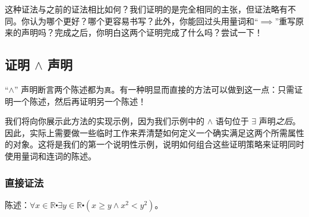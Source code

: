 这种证法与之前的证法相比如何？我们证明的是完全相同的主张，但证法略有不同。你认为哪个更好？哪个更容易书写？此外，你能回过头用量词和``$\implies$''重写原来的声明吗？完成之后，你明白这两个证明完成了什么吗？尝试一下！

\subsection{证明 $\land$ 声明}\label{sec:section4.9.4}

``$\land$'' 声明断言两个陈述都为\verb|真|。有一种明显而直接的方法可以做到这一点：只需证明一个陈述，然后再证明另一个陈述！

我们将向你展示此方法的实现示例，因为我们示例中的 $\land$ 语句位于 $\exists$ 声明\emph{之后}。因此，实际上需要做一些临时工作来弄清楚如何定义一个确实满足这两个所需属性的对象。这将是我们的第一个说明性示例，说明如何组合这些证明策略来证明同时使用量词和连词的陈述。

\subsubsection*{直接证法}

\begin{center}
    \noindent {}
\end{center}

\begin{example}[两数中较小数的平方可能更大]

    陈述：$ \forall x \in \mathbb{R} \centerdot \exists y \in \mathbb{R} \centerdot (x \ge y \land x^2 < y^2)$。
\end{example}

\begin{center}
    \noindent {}
\end{center}

